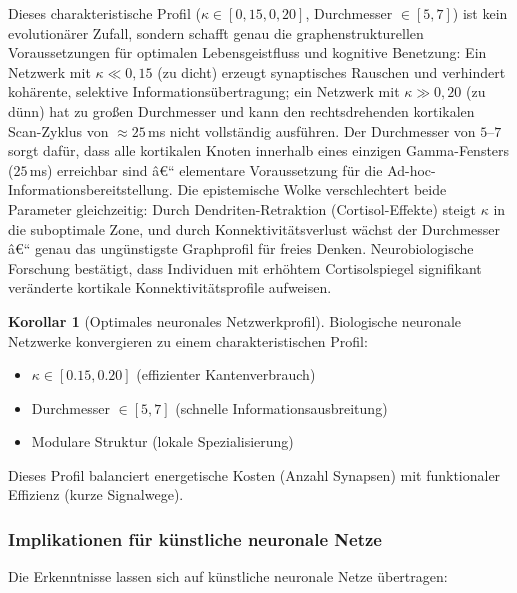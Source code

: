 ﻿\documentclass[a4paper,12pt]{article}
\theoremstyle{definition}
\newtheorem{korollar}{Korollar}
\begin{document}
	Dieses charakteristische Profil ($\kappa \in [0{,}15, 0{,}20]$, Durchmesser $\in [5, 7]$) ist kein evolutionärer Zufall, sondern schafft genau die graphenstrukturellen Voraussetzungen für optimalen Lebensgeistfluss und kognitive Benetzung: Ein Netzwerk mit $\kappa \ll 0{,}15$ (zu dicht) erzeugt synaptisches Rauschen und verhindert kohärente, selektive Informationsübertragung; ein Netzwerk mit $\kappa \gg 0{,}20$ (zu dünn) hat zu großen Durchmesser und kann den rechtsdrehenden kortikalen Scan-Zyklus von $\approx 25$\,ms nicht vollständig ausführen. Der Durchmesser von $5$--$7$ sorgt dafür, dass alle kortikalen Knoten innerhalb eines einzigen Gamma-Fensters ($25$\,ms) erreichbar sind â€“ elementare Voraussetzung für die Ad-hoc-Informationsbereitstellung. Die epistemische Wolke verschlechtert beide Parameter gleichzeitig: Durch Dendriten-Retraktion (Cortisol-Effekte) steigt $\kappa$ in die suboptimale Zone, und durch Konnektivitätsverlust wächst der Durchmesser â€“ genau das ungünstigste Graphprofil für freies Denken. Neurobiologische Forschung bestätigt, dass Individuen mit erhöhtem Cortisolspiegel signifikant veränderte kortikale Konnektivitätsprofile aufweisen.

	\begin{korollar}[Optimales neuronales Netzwerkprofil]
		Biologische neuronale Netzwerke konvergieren zu einem charakteristischen Profil:
		\begin{itemize}
			\item[-] $\kappa \in [0.15, 0.20]$ (effizienter Kantenverbrauch)
			\item[-] Durchmesser $\in [5, 7]$ (schnelle Informationsausbreitung)
			\item[-] Modulare Struktur (lokale Spezialisierung)
		\end{itemize}
		Dieses Profil balanciert energetische Kosten (Anzahl Synapsen) mit funktionaler Effizienz (kurze Signalwege).
	\end{korollar}
	
	\subsubsection{Implikationen für künstliche neuronale Netze}
	
	Die Erkenntnisse lassen sich auf künstliche neuronale Netze übertragen:
	
\end{document}
